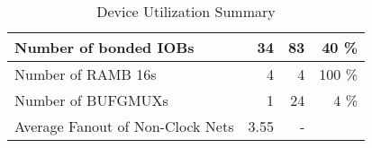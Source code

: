 \begin{table}[!htbp]
\begin{tabular}{|l|r|r|r|}
    Number of bonded IOBs                          & 34                                 & 83                                      & 40 \%                                     \\ \hline
    Number of RAMB 16s                             & 4                                  & 4                                       & 100 \%                                    \\ \hline
    Number of BUFGMUXs                             & 1                                  & 24                                      & 4 \%                                      \\ \hline
    Average Fanout of Non-Clock Nets               & 3.55                               & -                                       &                                           \\ \hline
    \end{tabular}
    \caption{Device Utilization Summary}
    \label{tab:utilization}
\end{table}

